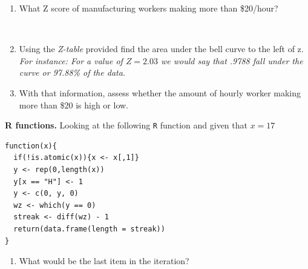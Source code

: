 \documentclass[12pt]{article}
\newcommand{\soln}[2]{$\:$\\ \vspace{#1}}{}
\newcommand{\qt}[1]{\textcolor{custom_carnelian}{\textbf{#1.}}}
\begin{document}
\begin{enumerate}

\item What Z score of manufacturing workers making more than \$20/hour?

\soln{3.5cm}{
Given: $X_{US} \sim N(\mu = 18.61, \sigma = 1.35)$
\[ P(X > 20) = P\left( Z > \frac{20 - 18.61}{1.35} \right) = P(Z > 1.02) = 0.154 \rightarrow 15.4\% \]
}


\item Using the \textit{Z-table} provided find the area under the bell curve to the left of z. \textit{For instance: For a value of $Z = 2.03$ we would say that .9788 fall under the curve or 97.88\% of the data.} 
\vspace{3cm}
\item With that information, assess whether the amount of hourly worker making more than \$20 is high or low. 
\end{enumerate}
\vspace{3cm}
%
%
%
\qt{R functions} Looking at the following \texttt{R} function and given that $x = 17$ 
\begin{verbatim}
function(x){
  if(!is.atomic(x)){x <- x[,1]}
  y <- rep(0,length(x))
  y[x == "H"] <- 1
  y <- c(0, y, 0)
  wz <- which(y == 0)
  streak <- diff(wz) - 1
  return(data.frame(length = streak))
}
\end{verbatim}

\begin{enumerate}
\item What would be the last item in the iteration?
\end{enumerate}
\end{document}
